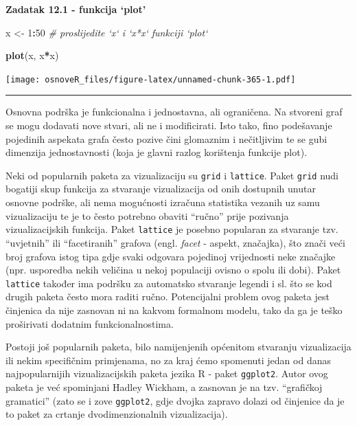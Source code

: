 \documentclass[]{book}
\newenvironment{Shaded}{\begin{snugshade}}{\end{snugshade}}
\newcommand{\KeywordTok}[1]{\textcolor[rgb]{0.13,0.29,0.53}{\textbf{#1}}}
\newcommand{\DecValTok}[1]{\textcolor[rgb]{0.00,0.00,0.81}{#1}}
\newcommand{\StringTok}[1]{\textcolor[rgb]{0.31,0.60,0.02}{#1}}
\newcommand{\CommentTok}[1]{\textcolor[rgb]{0.56,0.35,0.01}{\textit{#1}}}
\newcommand{\OperatorTok}[1]{\textcolor[rgb]{0.81,0.36,0.00}{\textbf{#1}}}
\newcommand{\NormalTok}[1]{#1}
\theoremstyle{definition}
\theoremstyle{definition}
\theoremstyle{definition}
\theoremstyle{remark}
\begin{document}
\textbf{Zadatak 12.1 - funkcija `plot'}

\begin{Shaded}
\begin{Highlighting}[]
\NormalTok{x <-}\StringTok{ }\DecValTok{1}\OperatorTok{:}\DecValTok{50}
\CommentTok{# proslijedite `x` i `x*x` funkciji `plot`}
\end{Highlighting}
\end{Shaded}

\begin{Shaded}
\begin{Highlighting}[]
\KeywordTok{plot}\NormalTok{(x, x}\OperatorTok{*}\NormalTok{x)}
\end{Highlighting}
\end{Shaded}

\texttt{[image: osnoveR\_files/figure-latex/unnamed-chunk-365-1.pdf]}

\begin{center}\rule{0.5\linewidth}{\linethickness}\end{center}

Osnovna podrška je funkcionalna i jednostavna, ali ograničena. Na
stvoreni graf se mogu dodavati nove stvari, ali ne i modificirati. Isto
tako, fino podešavanje pojedinih aspekata grafa često pozive čini
glomaznim i nečitljivim te se gubi dimenzija jednostavnosti (koja je
glavni razlog korištenja funkcije plot).

Neki od popularnih paketa za vizualizaciju su \texttt{grid} i
\texttt{lattice}. Paket \texttt{grid} nudi bogatiji skup funkcija za
stvaranje vizualizacija od onih dostupnih unutar osnovne podrške, ali
nema mogućnosti izračuna statistika vezanih uz samu vizualizaciju te je
to često potrebno obaviti ``ručno'' prije pozivanja vizualizacijskih
funkcija. Paket \texttt{lattice} je posebno popularan za stvaranje tzv.
``uvjetnih'' ili ``facetiranih'' grafova (engl. \emph{facet} - aspekt,
značajka), što znači veći broj grafova istog tipa gdje svaki odgovara
pojedinoj vrijednosti neke značajke (npr. usporedba nekih veličina u
nekoj populaciji ovisno o spolu ili dobi). Paket \texttt{lattice}
također ima podršku za automatsko stvaranje legendi i sl. što se kod
drugih paketa često mora raditi ručno. Potencijalni problem ovog paketa
jest činjenica da nije zasnovan ni na kakvom formalnom modelu, tako da
ga je teško proširivati dodatnim funkcionalnostima.

Postoji još popularnih paketa, bilo namijenjenih općenitom stvaranju
vizualizacija ili nekim specifičnim primjenama, no za kraj ćemo
spomenuti jedan od danas najpopularnijih vizualizacijskih paketa jezika
R - paket \texttt{ggplot2}. Autor ovog paketa je već spominjani Hadley
Wickham, a zasnovan je na tzv. ``grafičkoj gramatici'' (zato se i zove
\texttt{ggplot2}, gdje dvojka zapravo dolazi od činjenice da je to paket
za crtanje dvodimenzionalnih vizualizacija).
\end{document}
